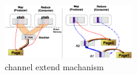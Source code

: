 \begin{figure}[!h!t]  
    \centering
    \includegraphics[width=0.5\textwidth]{eps/spmckern_extend.eps}
    \caption{channel extend machanism}
    \label{fig:spmckern:extend}
\end{figure}















